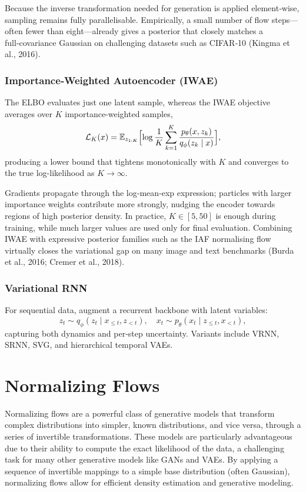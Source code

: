\documentclass{article}
\begin{document}
Because the inverse transformation needed for generation is applied element‑wise, sampling remains fully parallelisable. Empirically, a small number of flow steps—often fewer than eight—already gives a posterior that closely matches a full‑covariance Gaussian on challenging datasets such as CIFAR‑10 (Kingma et al., 2016).

\subsubsection{Importance‑Weighted Autoencoder (IWAE)}
The ELBO evaluates just one latent sample, whereas the IWAE objective averages over \(K\) importance-weighted samples,
\[
  \mathcal{L}_{K}(x)
    = \mathbb{E}_{z_{1:K}}
      \Bigl[
        \log\frac{1}{K}\sum_{k=1}^{K}
        \frac{p_{\theta}(x,z_{k})}
             {q_{\phi}(z_{k}\mid x)}
      \Bigr],
\]
producing a lower bound that tightens monotonically with \(K\) and converges to the true log-likelihood as \(K\!\to\!\infty\).

Gradients propagate through the log‑mean‑exp expression; particles with larger importance weights contribute more strongly, nudging the encoder towards regions of high posterior density.  In practice, \(K\!\in\![5,50]\) is enough during training, while much larger values are used only for final evaluation.  Combining IWAE with expressive posterior families such as the IAF normalising flow virtually closes the variational gap on many image and text benchmarks (Burda et al., 2016; Cremer et al., 2018).

\subsubsection{Variational RNN}
For sequential data, augment a recurrent backbone with latent variables:
\[
z_t \sim q_\phi(z_t\mid x_{\le t},z_{<t}),\quad
x_t \sim p_\theta(x_t\mid z_{\le t},x_{<t}),
\]
capturing both dynamics and per‑step uncertainty. Variants include VRNN, SRNN, SVG, and hierarchical temporal VAEs.

\clearpage\newpage

\section{Normalizing Flows} \label{sec:flows}

Normalizing flows are a powerful class of generative models that transform complex distributions into simpler, known distributions, and vice versa, through a series of invertible transformations. These models are particularly advantageous due to their ability to compute the exact likelihood of the data, a challenging task for many other generative models like GANs and VAEs. By applying a sequence of invertible mappings to a simple base distribution (often Gaussian), normalizing flows allow for efficient density estimation and generative modeling. 
\end{document}
